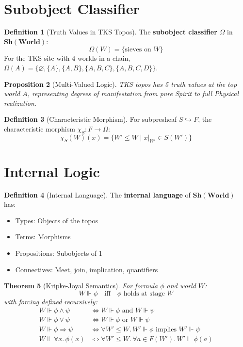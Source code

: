 \documentclass[11pt,twoside,openright]{book}
\theoremstyle{definition}
\newtheorem{definition}{Definition}[chapter]
\theoremstyle{plain}
\newtheorem{theorem}[definition]{Theorem}
\newtheorem{proposition}[definition]{Proposition}
\theoremstyle{remark}
\newcommand{\Sh}{\mathbf{Sh}}                %
\begin{document}
\section{Subobject Classifier}

\begin{definition}[Truth Values in TKS Topos]
\label{def:truth-values}
The \textbf{subobject classifier} $\Omega$ in $\Sh(\mathbf{World})$:
\[
\Omega(W) = \{\text{sieves on } W\}
\]
For the TKS site with 4 worlds in a chain, $\Omega(A) = \{\varnothing, \{A\}, \{A,B\}, \{A,B,C\}, \{A,B,C,D\}\}$.
\end{definition}

\begin{proposition}[Multi-Valued Logic]
\label{prop:multi-valued}
TKS topos has 5 truth values at the top world $A$, representing degrees of manifestation from pure Spirit to full Physical realization.
\end{proposition}

\begin{definition}[Characteristic Morphism]
\label{def:char-morph}
For subpresheaf $S \hookrightarrow F$, the characteristic morphism $\chi_S : F \to \Omega$:
\[
\chi_S(W)(x) = \{W' \leq W \mid x|_{W'} \in S(W')\}
\]
\end{definition}

\section{Internal Logic}

\begin{definition}[Internal Language]
\label{def:internal-lang}
The \textbf{internal language} of $\Sh(\mathbf{World})$ has:
\begin{itemize}
  \item Types: Objects of the topos
  \item Terms: Morphisms
  \item Propositions: Subobjects of 1
  \item Connectives: Meet, join, implication, quantifiers
\end{itemize}
\end{definition}

\begin{theorem}[Kripke-Joyal Semantics]
\label{thm:kripke-joyal}
For formula $\phi$ and world $W$:
\[
W \Vdash \phi \quad \text{iff} \quad \phi \text{ holds at stage } W
\]
with forcing defined recursively:
\begin{align}
W \Vdash \phi \land \psi &\iff W \Vdash \phi \text{ and } W \Vdash \psi \\
W \Vdash \phi \lor \psi &\iff W \Vdash \phi \text{ or } W \Vdash \psi \\
W \Vdash \phi \Rightarrow \psi &\iff \forall W' \leq W.\, W' \Vdash \phi \text{ implies } W' \Vdash \psi \\
W \Vdash \forall x.\, \phi(x) &\iff \forall W' \leq W.\, \forall a \in F(W').\, W' \Vdash \phi(a)
\end{align}
\end{theorem}
\end{document}
